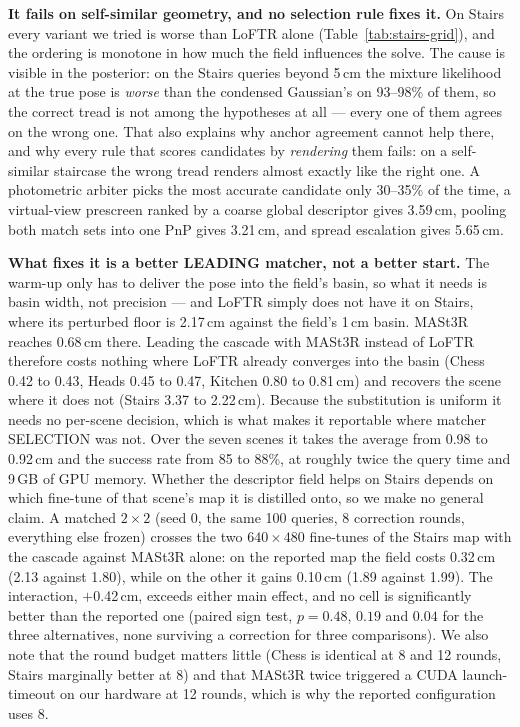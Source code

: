 \documentclass[journal]{IEEEtran}
\begin{document}
\textbf{It fails on self-similar geometry, and no selection rule fixes it.}
On Stairs every variant we tried is worse than LoFTR alone
(Table~\ref{tab:stairs-grid}), and the ordering is monotone in how much the
field influences the solve. The cause is visible in the posterior: on the
Stairs queries beyond 5\,cm the mixture likelihood at the true pose is
\emph{worse} than the condensed Gaussian's on 93--98\% of them, so the correct
tread is not among the hypotheses at all --- every one of them agrees on the
wrong one. That also explains why anchor agreement cannot help there, and why
every rule that scores candidates by \emph{rendering} them fails: on a
self-similar staircase the wrong tread renders almost exactly like the right
one. A photometric arbiter picks the most accurate candidate only 30--35\% of
the time, a virtual-view prescreen ranked by a coarse global descriptor gives
3.59\,cm, pooling both match sets into one PnP gives 3.21\,cm, and spread
escalation gives 5.65\,cm.

\textbf{What fixes it is a better LEADING matcher, not a better start.}
The warm-up only has to deliver the pose into the field's basin, so what it
needs is basin width, not precision --- and LoFTR simply does not have it on
Stairs, where its perturbed floor is 2.17\,cm against the field's 1\,cm basin.
MASt3R~\cite{mast3r} reaches 0.68\,cm there. Leading the cascade with MASt3R
instead of LoFTR therefore costs nothing where LoFTR already converges into the
basin (Chess 0.42 to 0.43, Heads 0.45 to 0.47, Kitchen 0.80 to 0.81\,cm) and
recovers the scene where it does not (Stairs 3.37 to 2.22\,cm). Because the
substitution is uniform it needs no per-scene decision, which is what makes it
reportable where matcher SELECTION was not. Over the seven scenes it takes the
average from 0.98 to 0.92\,cm and the success rate from 85 to 88\%, at roughly
twice the query time and 9\,GB of GPU memory. Whether the descriptor field helps
on Stairs depends on which fine-tune of that scene's map it is distilled onto, so
we make no general claim. A matched $2{\times}2$ (seed 0, the same 100 queries, 8
correction rounds, everything else frozen) crosses the two $640{\times}480$
fine-tunes of the Stairs map with the cascade against MASt3R alone: on the
reported map the field costs 0.32\,cm (2.13 against 1.80), while on the other it
gains 0.10\,cm (1.89 against 1.99). The interaction, $+$0.42\,cm, exceeds either
main effect, and no cell is significantly better than the reported one (paired
sign test, $p=0.48$, $0.19$ and $0.04$ for the three alternatives, none surviving
a correction for three comparisons). We also note that the round budget matters little (Chess is identical at
8 and 12 rounds, Stairs marginally better at 8) and that MASt3R twice triggered
a CUDA launch-timeout on our hardware at 12 rounds, which is why the reported
configuration uses 8.
\end{document}
